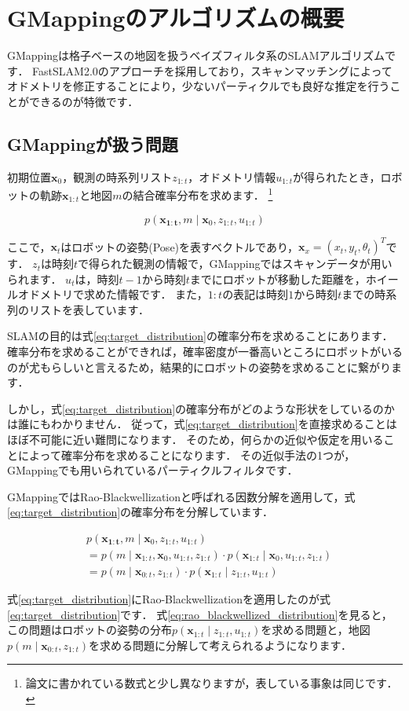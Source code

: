 \documentclass[{../../master}]{subfiles}
\begin{document}
\section{GMappingのアルゴリズムの概要}
\label{sec:gmapping_algorithm}

GMappingは格子ベースの地図を扱うベイズフィルタ系のSLAMアルゴリズムです．
FastSLAM2.0のアプローチを採用しており，スキャンマッチングによってオドメトリを修正することにより，少ないパーティクルでも良好な推定を行うことができるのが特徴です．

\subsection{GMappingが扱う問題}

初期位置$\bm{x}_{0}$，観測の時系列リスト$z_{1:t}$，オドメトリ情報$u_{1:t}$が得られたとき，ロボットの軌跡$\bm{x}_{1:t}$と地図$m$の結合確率分布を求めます．
\footnote{論文\cite{Gmapping}に書かれている数式と少し異なりますが，表している事象は同じです．}

\begin{equation}
  p(\bm{x_{1:t}}, m \mid \bm{x}_{0}, z_{1:t}, u_{1:t})
  \label{eq:target_distribution}
\end{equation}

ここで，$\bm{x}_{t}$はロボットの姿勢(Pose)を表すベクトルであり，$\bm{x}_{x} = (x_{t}, y_{t}, \theta_{t})^T$です．
$z_{t}$は時刻$t$で得られた観測の情報で，GMappingではスキャンデータが用いられます．
$u_{t}$は，時刻$t-1$から時刻$t$までにロボットが移動した距離を，ホイールオドメトリで求めた情報です．
また，$1:t$の表記は時刻$1$から時刻$t$までの時系列のリストを表しています．

SLAMの目的は式\ref{eq:target_distribution}の確率分布を求めることにあります．
確率分布を求めることができれば，確率密度が一番高いところにロボットがいるのが尤もらしいと言えるため，結果的にロボットの姿勢を求めることに繋がります．

しかし，式\ref{eq:target_distribution}の確率分布がどのような形状をしているのかは誰にもわかりません．
従って，式\ref{eq:target_distribution}を直接求めることはほぼ不可能に近い難問になります．
そのため，何らかの近似や仮定を用いることによって確率分布を求めることになります．
その近似手法の1つが，GMappingでも用いられているパーティクルフィルタです．

GMappingではRao-Blackwellizationと呼ばれる因数分解を適用して，式\ref{eq:target_distribution}の確率分布を分解しています．

\begin{equation}
  \begin{split}
    &p(\bm{x_{1:t}}, m \mid \bm{x}_{0}, z_{1:t}, u_{1:t}) \\
    &= p(m \mid \bm{x}_{1:t}, \bm{x}_{0}, u_{1:t}, z_{1:t}) \cdot p(\bm{x}_{1:t} \mid \bm{x}_{0}, u_{1:t}, z_{1:t}) \\
    &= p(m \mid \bm{x}_{0:t}, z_{1:t}) \cdot p(\bm{x}_{1:t} \mid z_{1:t}, u_{1:t})
  \end{split}
  \label{eq:rao_blackwellized_distribution}
\end{equation}

式\ref{eq:target_distribution}にRao-Blackwellizationを適用したのが式\ref{eq:target_distribution}です．
式\ref{eq:rao_blackwellized_distribution}を見ると，この問題はロボットの姿勢の分布$p(\bm{x}_{1:t} \mid z_{1:t}, u_{1:t})$を求める問題と，地図$p(m \mid \bm{x}_{0:t}, z_{1:t})$を求める問題に分解して考えられるようになります．
\end{document}
